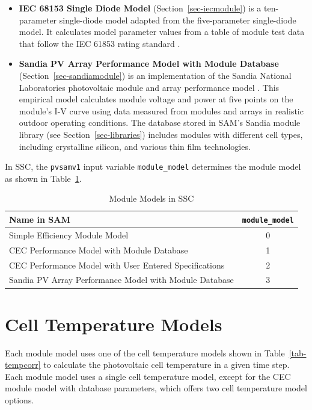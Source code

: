 \documentclass[12pt,letterpaper]{article}
\begin{document}
\begin{itemize}
\item \textbf{IEC 68153 Single Diode Model} (Section~\ref{sec-iecmodule}) is a ten-parameter single-diode model adapted from the five-parameter single-diode model. It calculates model parameter values from a table of module test data that follow the IEC 61853 rating standard \citep{dobos2014}. 
\item \textbf{Sandia PV Array Performance Model with Module Database}  (Section~\ref{sec-sandiamodule}) is an implementation of the Sandia National Laboratories photovoltaic module and array performance model \citep{king2004}. This empirical model calculates module voltage and power at five points on the module's I-V curve using data measured from modules and arrays in realistic outdoor operating conditions. The database stored in SAM's Sandia module library (see Section~\ref{sec-libraries}) includes modules with different cell types, including crystalline silicon, and various thin film technologies.
\end{itemize}

In SSC, the \texttt{pvsamv1} input variable \texttt{module\_model} determines the module model as shown in Table~\ref{tab-modulesubmodels}.

\begin{table}
\begin{center}
\caption{Module Models in SSC}
\begin{tabular}{lc}
\midrule
Name in SAM & \texttt{module\_model} \\
\midrule
Simple Efficiency Module Model & 0 \\
CEC Performance Model with Module Database & 1 \\
CEC Performance Model with User Entered Specifications & 2 \\
Sandia PV Array Performance Model with Module Database & 3 \\
\hline
\end{tabular}
\label{tab-modulesubmodels}
\end{center}
\end{table}

\section{Cell Temperature Models}\label{sec-celltempoptions}

Each module model uses one of the cell temperature models shown in Table~\ref{tab-tempcorr} to calculate the photovoltaic cell temperature in a given time step. Each module model uses a single cell temperature model, except for the CEC module model with database parameters, which offers two cell temperature model options.
\end{document}
